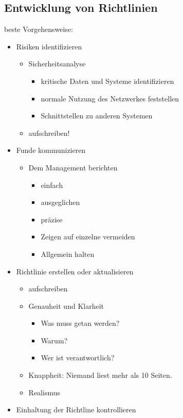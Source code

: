 \documentclass{article} %
\begin{document}
\subsection{Entwicklung von Richtlinien}
beste Vorgehensweise:
\begin{itemize}
	\item Risiken identifizieren
    
    \begin{itemize}
        \item Sicherheitsanalyse
        
        \begin{itemize}
            \item kritische Daten und Systeme identifizieren
            \item normale Nutzung des Netzwerkes feststellen
            \item Schnittstellen zu anderen Systemen
        \end{itemize}
        \item aufschreiben!
    \end{itemize}
    \item Funde kommunizieren
    
    \begin{itemize}
        \item Dem Management berichten
        
        \begin{itemize}
            \item einfach
            \item ausgeglichen
            \item präzise
            \item Zeigen auf einzelne vermeiden
            \item Allgemein halten
        \end{itemize}
    \end{itemize}
    \item Richtlinie erstellen oder aktualisieren
    
    \begin{itemize}
        \item aufschreiben
        \item Genauheit und Klarheit
        
        \begin{itemize}
            \item Was muss getan werden?
            \item Warum?
            \item Wer ist verantwortlich?
        \end{itemize}
        \item Knappheit: Niemand liest mehr als 10 Seiten.
        \item Realismus
    \end{itemize}
    \item Einhaltung der Richtline kontrollieren
    

\end{itemize}
\end{document}
